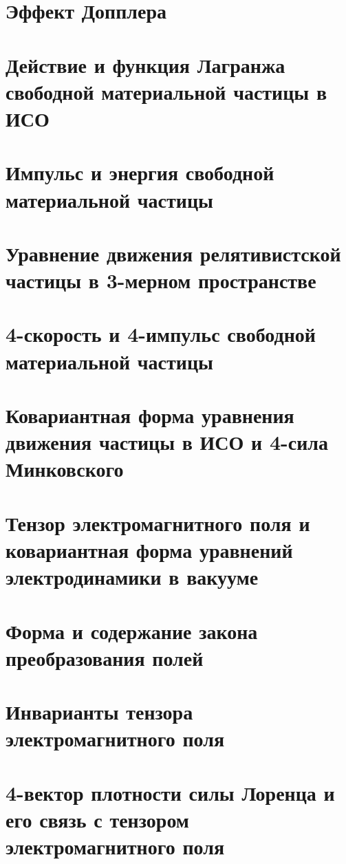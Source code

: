 \begin{multicols*}{2}
		\section{Эффект Допплера}
		
		\section{Действие и функция Лагранжа свободной материальной частицы в ИСО}
		
		\section{Импульс и энергия свободной материальной частицы}
		
		\section{Уравнение движения релятивистской частицы в 3-мерном пространстве}
		
		\section{4-скорость и 4-импульс свободной материальной частицы}
		
		\section{Ковариантная форма уравнения движения частицы в ИСО и 4-сила Минковского}
		
		\section{Тензор электромагнитного поля и ковариантная форма уравнений электродинамики в вакууме}
		
		\section{Форма и содержание закона преобразования полей}
		
		\section{Инварианты тензора электромагнитного поля}
		
		\section{4-вектор плотности силы Лоренца и его связь с тензором электромагнитного поля}
		

\end{multicols*}
